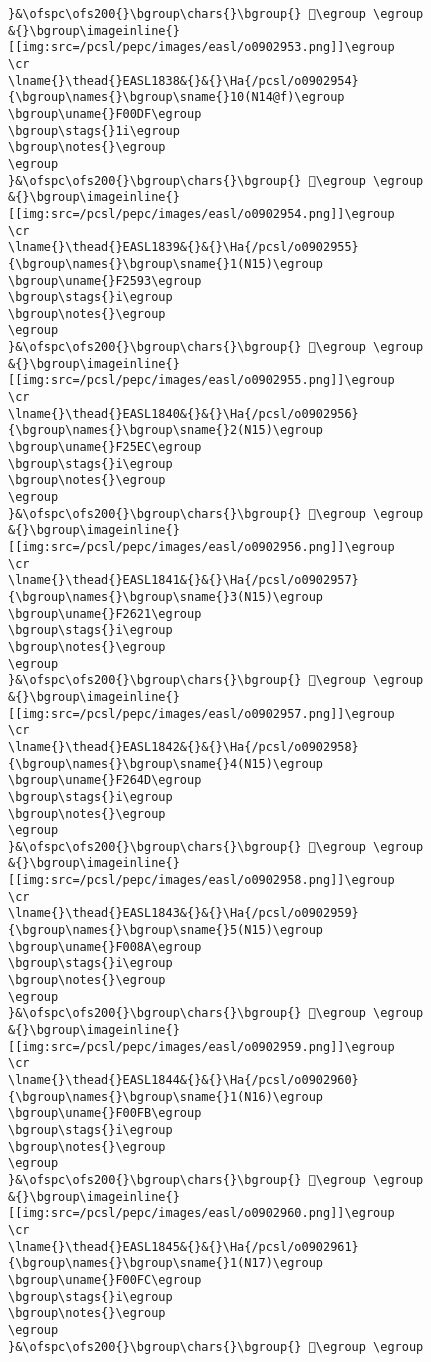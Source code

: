 \begin{verbatim}
}&\ofspc\ofs200{}\bgroup\chars{}\bgroup{} 󰂉\egroup \egroup
&{}\bgroup\imageinline{}[[img:src=/pcsl/pepc/images/easl/o0902953.png]]\egroup
\cr
\lname{}\thead{}EASL1838&{}&{}\Ha{/pcsl/o0902954}{\bgroup\names{}\bgroup\sname{}10(N14@f)\egroup
\bgroup\uname{}F00DF\egroup
\bgroup\stags{}1i\egroup
\bgroup\notes{}\egroup
\egroup
}&\ofspc\ofs200{}\bgroup\chars{}\bgroup{} 󰃟\egroup \egroup
&{}\bgroup\imageinline{}[[img:src=/pcsl/pepc/images/easl/o0902954.png]]\egroup
\cr
\lname{}\thead{}EASL1839&{}&{}\Ha{/pcsl/o0902955}{\bgroup\names{}\bgroup\sname{}1(N15)\egroup
\bgroup\uname{}F2593\egroup
\bgroup\stags{}i\egroup
\bgroup\notes{}\egroup
\egroup
}&\ofspc\ofs200{}\bgroup\chars{}\bgroup{} 󲖓\egroup \egroup
&{}\bgroup\imageinline{}[[img:src=/pcsl/pepc/images/easl/o0902955.png]]\egroup
\cr
\lname{}\thead{}EASL1840&{}&{}\Ha{/pcsl/o0902956}{\bgroup\names{}\bgroup\sname{}2(N15)\egroup
\bgroup\uname{}F25EC\egroup
\bgroup\stags{}i\egroup
\bgroup\notes{}\egroup
\egroup
}&\ofspc\ofs200{}\bgroup\chars{}\bgroup{} 󲗬\egroup \egroup
&{}\bgroup\imageinline{}[[img:src=/pcsl/pepc/images/easl/o0902956.png]]\egroup
\cr
\lname{}\thead{}EASL1841&{}&{}\Ha{/pcsl/o0902957}{\bgroup\names{}\bgroup\sname{}3(N15)\egroup
\bgroup\uname{}F2621\egroup
\bgroup\stags{}i\egroup
\bgroup\notes{}\egroup
\egroup
}&\ofspc\ofs200{}\bgroup\chars{}\bgroup{} 󲘡\egroup \egroup
&{}\bgroup\imageinline{}[[img:src=/pcsl/pepc/images/easl/o0902957.png]]\egroup
\cr
\lname{}\thead{}EASL1842&{}&{}\Ha{/pcsl/o0902958}{\bgroup\names{}\bgroup\sname{}4(N15)\egroup
\bgroup\uname{}F264D\egroup
\bgroup\stags{}i\egroup
\bgroup\notes{}\egroup
\egroup
}&\ofspc\ofs200{}\bgroup\chars{}\bgroup{} 󲙍\egroup \egroup
&{}\bgroup\imageinline{}[[img:src=/pcsl/pepc/images/easl/o0902958.png]]\egroup
\cr
\lname{}\thead{}EASL1843&{}&{}\Ha{/pcsl/o0902959}{\bgroup\names{}\bgroup\sname{}5(N15)\egroup
\bgroup\uname{}F008A\egroup
\bgroup\stags{}i\egroup
\bgroup\notes{}\egroup
\egroup
}&\ofspc\ofs200{}\bgroup\chars{}\bgroup{} 󰂊\egroup \egroup
&{}\bgroup\imageinline{}[[img:src=/pcsl/pepc/images/easl/o0902959.png]]\egroup
\cr
\lname{}\thead{}EASL1844&{}&{}\Ha{/pcsl/o0902960}{\bgroup\names{}\bgroup\sname{}1(N16)\egroup
\bgroup\uname{}F00FB\egroup
\bgroup\stags{}i\egroup
\bgroup\notes{}\egroup
\egroup
}&\ofspc\ofs200{}\bgroup\chars{}\bgroup{} 󰃻\egroup \egroup
&{}\bgroup\imageinline{}[[img:src=/pcsl/pepc/images/easl/o0902960.png]]\egroup
\cr
\lname{}\thead{}EASL1845&{}&{}\Ha{/pcsl/o0902961}{\bgroup\names{}\bgroup\sname{}1(N17)\egroup
\bgroup\uname{}F00FC\egroup
\bgroup\stags{}i\egroup
\bgroup\notes{}\egroup
\egroup
}&\ofspc\ofs200{}\bgroup\chars{}\bgroup{} 󰃼\egroup \egroup

\end{verbatim}
